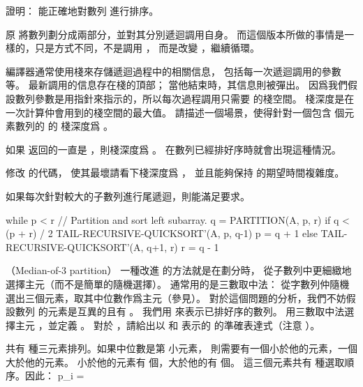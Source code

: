 \startigBase[a]
\startitem
證明：  能正確地對數列  進行排序。
\stopitem

\startANSWER
原  將數列劃分成兩部分，並對其分別遞迴調用自身。
而這個版本所做的事情是一樣的，只是方式不同，不是調用 ，
而是改變 ，繼續循環。
\stopANSWER
\stopigBase

編譯器通常使用{\EMP 棧}來存儲遞迴過程中的相關信息，
包括每一次遞迴調用的參數等。
最新調用的信息存在棧的頂部；
當他結束時，其信息則被{\EMP 彈出}。
因爲我們假設數列參數是用指針來指示的，所以每次過程調用只需要  的棧空間。
{\EMP 棧深度}是在一次計算仲會用到的棧空間的最大值。
\startigBase[a,continue]
\startitem
請描述一個場景，使得針對一個包含  個元素數列的  的
棧深度爲 。
\stopitem

\startANSWER
如果  返回的一直是 ，則棧深度爲 。
在數列已經排好序時就會出現這種情況。
\stopANSWER

\startitem
修改  的代碼，
使其最壞請看下棧深度爲 ，
並且能夠保持  的期望時間複雜度。
\stopitem

\startANSWER
如果每次針對較大的子數列進行尾遞迴，則能滿足要求。

\startCLRS
while p < r
	// Partition and sort left subarray.
	q = PARTITION(A, p, r)
	if q < (p + r) / 2
		TAIL-RECURSIVE-QUICKSORT’(A, p, q-1)
		p = q + 1
	else
		TAIL-RECURSIVE-QUICKSORT’(A, q+1, r)
		r = q - 1
\stopCLRS
\stopANSWER
\stopigBase
\stopPROBLEM

\startPROBLEM
（Median-of-3 partition）
一種改進  的方法就是在劃分時，
從子數列中更細緻地選擇主元（而不是簡單的隨機選擇）。
通常用的是三數取中法：
從字數列仲隨機選出三個元素，取其中位數作爲主元（參見）。
對於這個問題的分析，我們不妨假設數列  的元素是互異的且有 。
我們用  來表示已排好序的數列。
用三數取中法選擇主元 ，並定義 。
\startigBase[a]
\startitem
對於 ，請給出以  和  表示的  的準確表達式（注意 ）。
\stopitem

\startANSWER
共有  種三元素排列。如果中位數是第  小元素，
則需要有一個小於他的元素，一個大於他的元素。
小於他的元素有  個，大於他的有  個。
這三個元素共有  種選取順序。因此：
\startformula
p_i = 
\stopformula
\stopANSWER

